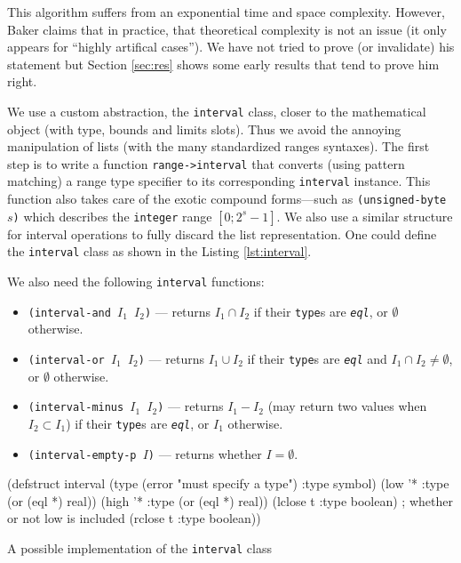 \documentclass[format=sigconf]{acmart}
\newcommand\code[2][\small]{\sloppy\texttt{#1#2}}
\theoremstyle{definition}
\begin{document}
This algorithm suffers from an exponential time and space complexity. However,
Baker claims that in practice, that theoretical complexity is not an issue (it
only appears for ``highly artifical cases''). We have not tried to prove (or
invalidate) his statement but Section \ref{sec:res} shows some early results
that tend to prove him right.

We use a custom abstraction, the \code{interval} class, closer to the
mathematical object (with type, bounds and limits slots). Thus we avoid the
annoying manipulation of lists (with the many standardized ranges syntaxes).
The first step is to write a function \code{range->interval} that converts
(using pattern matching) a range type specifier to its corresponding
\code{interval} instance. This function also takes care of the exotic compound
forms---such as \code{(unsigned-byte $s$)} which describes the \code{integer}
range $\left[0; 2^s-1\right]$. We also use a similar structure for interval
operations to fully discard the list representation. One could define the
\code{interval} class as shown in the Listing \ref{lst:interval}.

We also need the following \code{interval} functions:
\begin{itemize}
\item \code{(interval-and $I_1$ $I_2$)} --- returns $I_1 \cap I_2$ if their
  \code{type}s are \emph{\code{eql}}, or $\emptyset$ otherwise.
\item \code{(interval-or $I_1$ $I_2$)} --- returns $I_1 \cup I_2$ if their
  \code{type}s are \emph{\code{eql}} and $I_1 \cap I_2 \not= \emptyset$, or $\emptyset$ otherwise.
\item \code{(interval-minus $I_1$ $I_2$)} --- returns $I_1 - I_2$ (may return
  two values when $I_2 \subset I_1$) if their \code{type}s are \emph{\code{eql}},
  or $I_1$ otherwise.
\item \code{(interval-empty-p $I$)} --- returns whether $I = \emptyset$.
\end{itemize}

\begin{listing}
\begin{clcode}
(defstruct interval
  (type (error "must specify a type") :type symbol)
  (low '* :type (or (eql *) real))
  (high '* :type (or (eql *) real))
  (lclose t :type boolean) ; whether or not low is included
  (rclose t :type boolean))
\end{clcode}
\caption{A possible implementation of the \code{interval} class}
\label{lst:interval}
\end{listing}
\end{document}
